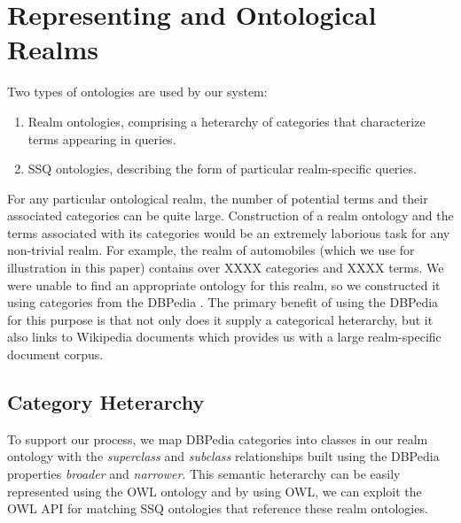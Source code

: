 \section{Representing and Ontological Realms}
Two types of ontologies are used by our system:
\begin{enumerate}
\item Realm ontologies, comprising a heterarchy of categories that
  characterize terms appearing in queries.
\item SSQ ontologies, describing the form of particular
  realm-specific queries.
\end{enumerate}
For any particular ontological realm, the number of potential
terms and their associated categories can be quite large.
Construction of a realm ontology and the terms associated
with its categories would be an extremely laborious task
for any non-trivial realm. For example, the realm of automobiles (which
we use for illustration in this paper) contains 
over XXXX categories and XXXX terms. We were unable to find
an appropriate ontology for this realm, so we constructed it
using categories from the DBPedia \cite{Auer07dbpedia:a}.
The primary benefit of using the DBPedia for this purpose is
that not only does it supply a categorical heterarchy, but it
also links to Wikipedia documents which provides us with a large
realm-specific document corpus.

\subsection{Category Heterarchy} 

To support our process, we map DBPedia categories into classes in our realm ontology with the \textit{superclass} and \textit{subclass} relationships built using the DBPedia properties \textit{broader} and \textit{narrower}. This  semantic heterarchy can be easily represented using the OWL ontology and by using OWL, we can exploit the OWL API for matching SSQ ontologies that reference these realm ontologies.


